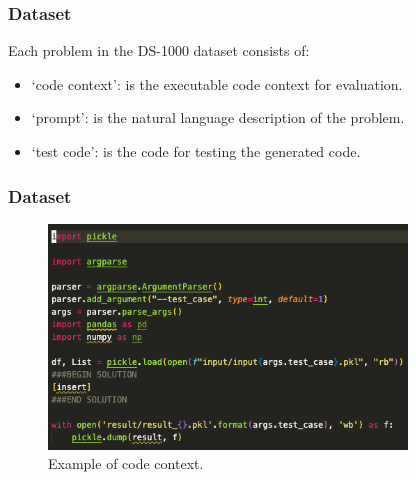 \documentclass{beamer}
\newcounter{cont}
\begin{document}
\begin{frame}[allowframebreaks]
\frametitle{Dataset}
Each problem in the DS-1000 dataset consists of:
  \begin{itemize}
    \item `code context': is the executable code context for evaluation.
    \item `prompt': is the natural language description of the problem.
    \item `test code': is the code for testing the generated code.
  \end{itemize}
\end{frame}

\begin{frame}[allowframebreaks]
\frametitle{Dataset}
\begin{figure}
  \centering
  \includegraphics[width=0.85\textwidth]{img/code_context.png}
  \caption{Example of code context.}
\end{figure}
\end{frame}
\end{document}
